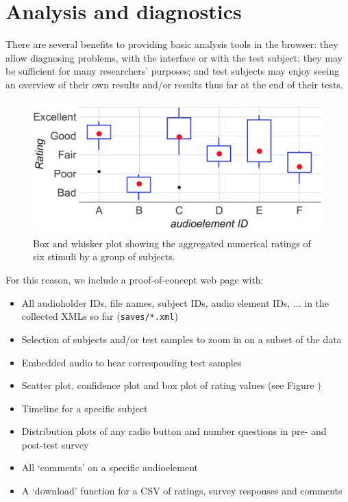 \documentclass{sig-alternate}
\begin{document}
\section{Analysis and diagnostics}
\label{sec:analysis}
	There are several benefits to providing basic analysis tools in the browser: they allow diagnosing problems, with the interface or with the test subject; they may be sufficient for many researchers' purposes; and test subjects may enjoy seeing an overview of their own results and/or results thus far at the end of their tests. 
	\begin{figure}[bhf]
		\centering
		\includegraphics[width=.5\textwidth]{boxplot.png}
		\caption{Box and whisker plot showing the aggregated numerical ratings of six stimuli by a group of subjects.}
		\label{fig:timeline}
	\end{figure}
	For this reason, we include a proof-of-concept web page with:
	\begin{itemize}[noitemsep,nolistsep]
		\item All audioholder IDs, file names, subject IDs, audio element IDs, ... in the collected XMLs so far (\texttt{saves/*.xml})
		\item Selection of subjects and/or test samples to zoom in on a subset of the data %
		\item Embedded audio to hear corresponding test samples %
		\item Scatter plot, confidence plot and box plot of rating values (see Figure )
		\item Timeline for a specific subject %
		\item Distribution plots of any radio button and number questions in pre- and post-test survey %
		\item All `comments' on a specific audioelement
		\item A `download' function for a CSV of ratings, survey responses and comments%
	\end{itemize}
\end{document}
